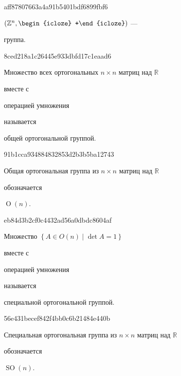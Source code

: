 \begin{note}{aff87807663a4a91b5401bdf6899fbf6}
    \begin{center}
        \({ (\mathbb Z^{n}, \begin{icloze}{1}+\end{icloze}) }\) --- \begin{icloze}{2}группа.\end{icloze}
   \end{center}
\end{note}

\begin{note}{8ced218a1c26445e933dbfd17c1eaad6}
    \begin{icloze}{2}Множество всех ортогональных \({ n \times n }\) матриц над \({ \mathbb R }\)\end{icloze} вместе с \begin{icloze}{3}операцией умножения\end{icloze} называется \begin{icloze}{1}общей ортогональной группой.\end{icloze}
\end{note}

\begin{note}{91b1cca934884832853d2b3b5ba12743}
    \begin{icloze}{2}Общая ортогональная группа из \({ n \times n }\) матриц над \({ \mathbb R }\)\end{icloze} обозначается \begin{icloze}{1}\({ \operatorname{O}(n) }\).\end{icloze}
\end{note}

\begin{note}{eb84d3b2cf0c4432ad56a0dbdc8604af}
    \begin{icloze}{2}Множество \({ \left\{ A \in O(n) \mid \det A = 1 \right\} }\)\end{icloze} вместе с \begin{icloze}{3}операцией умножения\end{icloze} называется \begin{icloze}{1}специальной ортогональной группой.\end{icloze}
\end{note}

\begin{note}{56e431becef842f4bb0c6b21484e440b}
    \begin{icloze}{2}Специальная ортогональная группа из \({ n \times n }\) матриц над \({ \mathbb R }\)\end{icloze} обозначается \begin{icloze}{1}\({ \operatorname{SO}(n) }\).\end{icloze}
\end{note}

